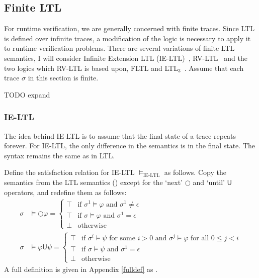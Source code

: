\documentclass[a4paper]{article}
\newcommand{\U}{\mathsf{U}}
\newcommand{\tand}{\text{ and }}
\newcommand{\fsome}{\text{ for some }}
\newcommand{\fall}{\text{ for all }}
\begin{document}
\subsection{Finite LTL}
For runtime verification, we are generally concerned with finite traces. Since LTL is defined over infinite traces, a modification of the logic is necessary to apply it to runtime verification problems. %
There are several variations of finite LTL semantics, I will consider Infinite Extension LTL (IE-LTL)~\autocite{rosu2005rewriting}, RV-LTL~\autocite{bauer2010comparing} and the two logics which RV-LTL is based upon, FLTL and LTL$_3$~\autocite{bauer2010comparing}.
Assume that each trace $\sigma$ in this section is finite.

TODO expand

\subsubsection{IE-LTL} The idea behind IE-LTL is to assume that the final state of a trace repeats forever. For IE-LTL, the only difference in the semantics is in the final state. The syntax remains the same as in LTL.
\begin{defn}\label{ieltlsem}

  Define the satisfaction relation for IE-LTL $\vDash_{\text{IE-LTL}}$ as follows. Copy the semantics from the LTL semantics () except for the `next' $\bigcirc$ and `until' $\U$ operators, and redefine them as follows:
  \begin{align*}
    \sigma &\vDash \bigcirc \varphi =
      \begin{cases}
        \top &\text{if } \sigma^1 \vDash \varphi \tand \sigma^1 \ne \epsilon\\
        \top &\text{if } \sigma \vDash \varphi \tand \sigma^1 = \epsilon\\
        \bot &\text{otherwise}
      \end{cases}\\
    \sigma &\vDash \varphi \U \psi =
    \begin{cases}
      \top &\text{if } \sigma^i \vDash \psi \fsome i > 0 \tand \sigma^j \vDash \varphi \fall 0 \leq j < i\\
      \top &\text{if } \sigma \vDash \psi \tand \sigma^1 = \epsilon\\
      \bot &\text{otherwise}
    \end{cases}
  \end{align*}
  A full definition is given in Appendix \ref{fulldef} as .
\end{defn}
\end{document}
